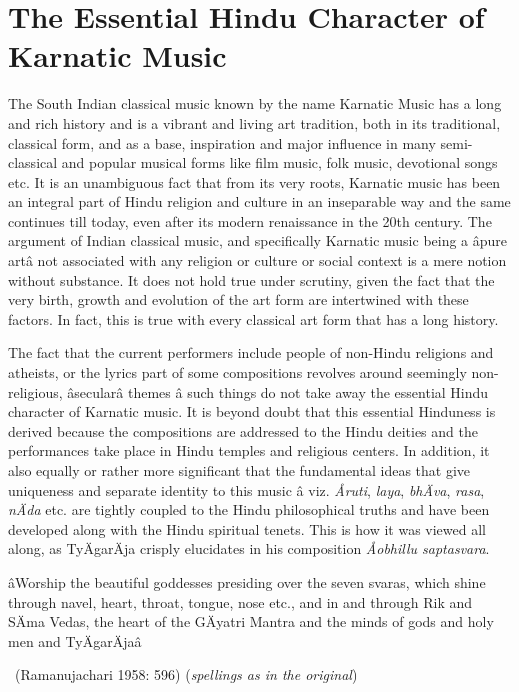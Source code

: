 \vspace{-.3cm}

\section*{The Essential Hindu Character of Karnatic Music}

The South Indian classical music known by the name Karnatic Music has a long and rich history and is a vibrant and living art tradition, both in its traditional, classical form, and as a base, inspiration and major influence in many semi-classical and popular musical forms like film music, folk music, devotional songs etc. It is an unambiguous fact that from its very roots, Karnatic music has been an integral part of Hindu religion and culture in an inseparable way and the same continues till today, even after its modern renaissance in the 20th century. The argument of Indian classical music, and specifically Karnatic music being a âpure artâ not associated with any religion or culture or social context is a mere notion without substance. It does not hold true under scrutiny, given the fact that the very birth, growth and evolution of the art form are intertwined with these factors. In fact, this is true with every classical art form that has a long history.

The fact that the current performers include people of non-Hindu religions and atheists, or the lyrics part of some compositions revolves around seemingly non-religious, âsecularâ themes â such things do not take away the essential Hindu character of Karnatic music. It is beyond doubt that this essential Hinduness is derived because the compositions are addressed to the Hindu deities and the performances take place in Hindu temples and religious centers. In addition, it also equally or rather more significant that the fundamental ideas that give uniqueness and separate identity to this music â viz. \textit{Åruti}, \textit{laya}, \textit{bhÄva}, \textit{rasa}, \textit{nÄda} etc. are tightly coupled to the Hindu philosophical truths and have been developed along with the Hindu spiritual tenets. This is how it was viewed all along, as TyÄgarÄja crisply elucidates in his composition \textit{Åobhillu saptasvara}.

\begin{myquote}
âWorship the beautiful goddesses presiding over the seven svaras, which shine through navel, heart, throat, tongue, nose etc., and in and through Rik and SÄma Vedas, the heart of the GÄyatri Mantra and the minds of gods and holy men and TyÄgarÄjaâ 

~\hfill (Ramanujachari 1958: 596) (\textit{spellings as in the original})
\end{myquote}

